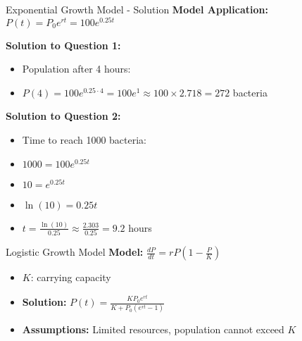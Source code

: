 \documentclass[10pt,aspectratio=169]{beamer}
\begin{document}
\begin{frame}{Exponential Growth Model - Solution}
    \textbf{Model Application:} $P(t) = P_0 e^{rt} = 100e^{0.25t}$
    
    \textbf{Solution to Question 1:}
    \begin{itemize}
        \item Population after 4 hours: 
        \item $P(4) = 100e^{0.25 \cdot 4} = 100e^1 \approx 100 \times 2.718 = 272$ bacteria
    \end{itemize}
    
    \textbf{Solution to Question 2:}
    \begin{itemize}
        \item Time to reach 1000 bacteria:
        \item $1000 = 100e^{0.25t}$
        \item $10 = e^{0.25t}$
        \item $\ln(10) = 0.25t$
        \item $t = \frac{\ln(10)}{0.25} \approx \frac{2.303}{0.25} = 9.2$ hours
    \end{itemize}
\end{frame}

\begin{frame}{Logistic Growth Model}
    \textbf{Model:} $\frac{dP}{dt} = rP\left(1-\frac{P}{K}\right)$
    \begin{itemize}
        \item $K$: carrying capacity
        \item \textbf{Solution:} $P(t) = \frac{KP_0 e^{rt}}{K + P_0 (e^{rt} - 1)}$
        \item \textbf{Assumptions:} Limited resources, population cannot exceed $K$
    \end{itemize}
\end{frame}
\end{document}
